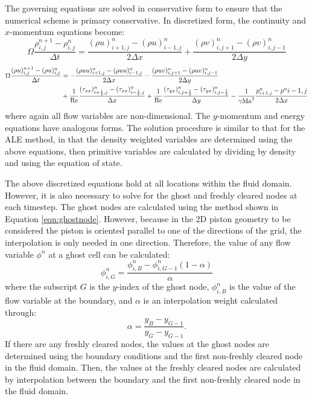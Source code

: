 \documentclass{article}
\begin{document}
The governing equations are solved in conservative form to ensure that the numerical scheme is primary conservative. In discretized form,  the continuity and $x$-momentum equations become:
\begin{equation}
\Omega \frac{\rho_{i,j}^{n+1} - \rho_{i,j}^n}{\Delta t} = \frac{(\rho u)_{i+1,j}^{n} - (\rho u)_{i-1,j}^n}{2 \Delta x} + \frac{(\rho v)_{i,j+1}^{n} - (\rho v)_{i,j-1}^n}{2 \Delta y}
\end{equation}
\begin{equation}
\begin{aligned}
\Omega \frac{(\rho u)_{i,j}^{n+1} - (\rho u)_{i,j}^n}{\Delta t} 
&= - \frac{(\rho u u)_{i+1,j}^{n} - (\rho u u)_{i-1,j}^n}{2 \Delta x} 
- \frac{(\rho u v)_{i,j+1}^{n} - (\rho u v)_{i,j-1}^n}{2 \Delta y}  \\
&+ \frac{1}{\rm{Re}}\frac{(\tau_{xx})^n_{i+\frac{1}{2},j} -  (\tau_{xx})^n_{i-\frac{1}{2},j}}{\Delta x}
+ \frac{1}{\rm{Re}}
\frac{(\tau_{yx})^n_{i,j+\frac{1}{2}} -  (\tau_{yx})^n_{i,j-\frac{1}{2}}}{\Delta y}
- \frac{1}{\gamma \rm{Ma}^2} \frac{p^n_{i+1,j} - p^n{i-1,j}}{2 \Delta x}
\end{aligned}
\end{equation}
where again all flow variables are non-dimensional. The $y$-momentum and energy equations have analogous forms. The solution procedure is similar to that for the ALE method, in that the density weighted variables are determined using the above equations, then primitive variables are calculated by dividing by density and using the equation of state. 

The above discretized equations hold at all locations within the fluid domain. However, it is also necessary to solve for the ghost and freshly cleared nodes at each timestep. The ghost nodes are calculated using the method shown in Equation \ref{eqn:ghostnode}. However, because in the 2D piston geometry to be considered the piston is oriented parallel to one of the directions of the grid, the interpolation is only needed in one direction. Therefore, the value of any flow variable $\phi^n$ at a ghost cell can be calculated:
\begin{equation}
\phi^n_{i,G} = \frac{\phi_{i,B}^n - \phi^n_{i,G-1} (1- \alpha)}{\alpha}
\end {equation} 
where the subscript $G$ is the $y$-index of the ghost node, $\phi_{i,B}^n$ is the value of the flow variable at the boundary, and $\alpha$ is an interpolation weight calculated through:
\begin{equation}
\alpha = \frac{y_B - y_{G-1}}{y_G - y_{G-1}}.
\end{equation} 
If there are any freshly cleared nodes, the values at the ghost nodes are determined using the boundary conditions and the first non-freshly cleared node in the fluid domain. Then, the values at the freshly cleared nodes are calculated by interpolation between the boundary and the first non-freshly cleared node in the fluid domain.
\end{document}
